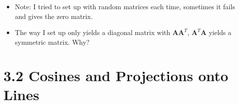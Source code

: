 \begin{itemize}
\begin{enumerate}
    \begin{itemize}
      \item Note: I tried to set up with random matrices each time, sometimes it
        fails and gives the zero matrix.
      \item The way I set up only yields a diagonal matrix with
      \(\bm{A}\bm{A}^T \), \(\bm{A}^T \bm{A} \) yields a symmetric matrix. Why?
    \end{itemize}

  \end{enumerate}
\end{itemize}

\section{3.2 Cosines and Projections onto Lines}
